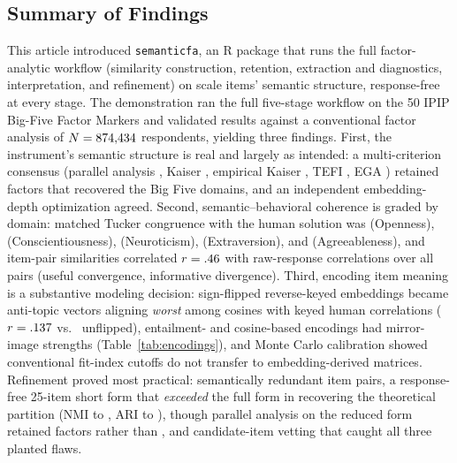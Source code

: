 \subsection{Summary of Findings}

This article introduced \texttt{semanticfa}, an R package that runs the
full factor-analytic workflow (similarity construction,
retention, extraction and diagnostics, interpretation, and refinement) on
scale items' semantic structure, response-free at every stage. The
demonstration ran the full five-stage workflow on the 50 IPIP Big-Five Factor
Markers and validated results against a conventional factor analysis of
$N = 874{,}434$ respondents, yielding three findings. First, the
instrument's semantic structure is real and largely as intended: a
multi-criterion consensus (parallel analysis \valPaK, Kaiser \valKaiserK, empirical Kaiser \valEkcK, TEFI \valTefiK, EGA \valEgaK)
retained \valConsensusKWord{} factors that recovered the Big Five domains, and an
independent embedding-depth optimization agreed. Second,
semantic--behavioral coherence is graded by domain: matched Tucker
congruence with the human solution was \valPhiO{} (Openness), \valPhiC
(Conscientiousness), \valPhiN{} (Neuroticism), \valPhiE{} (Extraversion), and \valPhiA
(Agreeableness), and item-pair similarities correlated $r = .46$ with
raw-response correlations over all \valNPairs{} pairs (useful convergence,
informative divergence). Third, encoding item meaning is a substantive
modeling decision: sign-flipped reverse-keyed embeddings became anti-topic
vectors aligning \emph{worst} among cosines with keyed human correlations ($r = .137$
vs.\ \valAtRKeyed{} unflipped), entailment- and cosine-based encodings had
mirror-image strengths (Table~\ref{tab:encodings}), and Monte Carlo
calibration showed conventional fit-index cutoffs do not transfer to
embedding-derived matrices. Refinement proved most practical: \valUvaPairsWord
semantically redundant item pairs, a response-free 25-item short form
that \emph{exceeded} the full form in recovering the theoretical partition
(NMI \valSfNmiFull{} to \valSfNmiRed, ARI \valSfAriFull{} to \valSfAriRed), though parallel analysis on the
reduced form retained \valSfKRedWord{} factors rather than \valSfKFullWord, and candidate-item
vetting that caught all three planted flaws.
